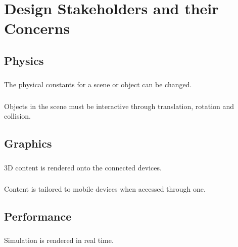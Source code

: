 \documentclass[onecolumn, draftclsnofoot,10pt, compsoc]{IEEEtran}
\begin{document}
\section{Design Stakeholders and their Concerns}

\subsection{Physics}
\subsubsection{}
The physical constants for a scene or object can be changed.
\subsubsection{}
Objects in the scene must be interactive through translation, rotation and collision.

\subsection{Graphics}
\subsubsection{}
3D content is rendered onto the connected devices.
\subsubsection{}
Content is tailored to mobile devices when accessed through one.

\subsection{Performance}
\subsubsection{}
Simulation is rendered in real time.
\end{document}
